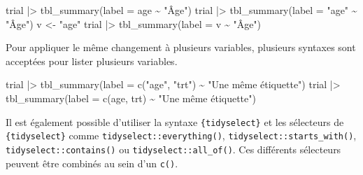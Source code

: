 \documentclass[
  letterpaper,
  DIV=11,
  numbers=noendperiod,
  oneside]{scrreprt}
\newenvironment{Shaded}{\begin{snugshade}}{\end{snugshade}}
\newcommand{\AttributeTok}[1]{\textcolor[rgb]{0.40,0.45,0.13}{#1}}
\newcommand{\FunctionTok}[1]{\textcolor[rgb]{0.28,0.35,0.67}{#1}}
\newcommand{\NormalTok}[1]{\textcolor[rgb]{0.00,0.23,0.31}{#1}}
\newcommand{\OtherTok}[1]{\textcolor[rgb]{0.00,0.23,0.31}{#1}}
\newcommand{\SpecialCharTok}[1]{\textcolor[rgb]{0.37,0.37,0.37}{#1}}
\newcommand{\StringTok}[1]{\textcolor[rgb]{0.13,0.47,0.30}{#1}}
\begin{document}
\begin{tcolorbox}
\begin{Shaded}
\begin{Highlighting}[]
\NormalTok{trial }\SpecialCharTok{|\textgreater{}} 
  \FunctionTok{tbl\_summary}\NormalTok{(}\AttributeTok{label =}\NormalTok{ age }\SpecialCharTok{\textasciitilde{}} \StringTok{"Âge"}\NormalTok{)}
\NormalTok{trial }\SpecialCharTok{|\textgreater{}} 
  \FunctionTok{tbl\_summary}\NormalTok{(}\AttributeTok{label =} \StringTok{"age"} \SpecialCharTok{\textasciitilde{}} \StringTok{"Âge"}\NormalTok{)}
\NormalTok{v }\OtherTok{\textless{}{-}} \StringTok{"age"}
\NormalTok{trial }\SpecialCharTok{|\textgreater{}} 
  \FunctionTok{tbl\_summary}\NormalTok{(}\AttributeTok{label =}\NormalTok{ v }\SpecialCharTok{\textasciitilde{}} \StringTok{"Âge"}\NormalTok{)}
\end{Highlighting}
\end{Shaded}

Pour appliquer le même changement à plusieurs variables, plusieurs
syntaxes sont acceptées pour lister plusieurs variables.

\begin{Shaded}
\begin{Highlighting}[]
\NormalTok{trial }\SpecialCharTok{|\textgreater{}} 
  \FunctionTok{tbl\_summary}\NormalTok{(}\AttributeTok{label =} \FunctionTok{c}\NormalTok{(}\StringTok{"age"}\NormalTok{, }\StringTok{"trt"}\NormalTok{) }\SpecialCharTok{\textasciitilde{}} \StringTok{"Une même étiquette"}\NormalTok{)}
\NormalTok{trial }\SpecialCharTok{|\textgreater{}} 
  \FunctionTok{tbl\_summary}\NormalTok{(}\AttributeTok{label =} \FunctionTok{c}\NormalTok{(age, trt) }\SpecialCharTok{\textasciitilde{}} \StringTok{"Une même étiquette"}\NormalTok{)}
\end{Highlighting}
\end{Shaded}

Il est également possible d'utiliser la syntaxe \texttt{\{tidyselect\}}
et les sélecteurs de \texttt{\{tidyselect\}} comme
\texttt{tidyselect::everything()}, \texttt{tidyselect::starts\_with()},
\texttt{tidyselect::contains()} ou \texttt{tidyselect::all\_of()}. Ces
différents sélecteurs peuvent être combinés au sein d'un \texttt{c()}.


\end{tcolorbox}
\end{document}
